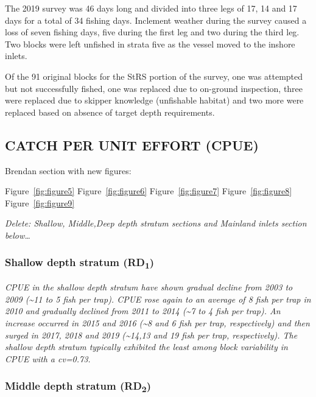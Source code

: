 \documentclass[12pt]{article}\usepackage[]{graphicx}\usepackage[]{color}
\begin{document}
The 2019 survey was 46 days long and divided into three legs of 17, 14 and 17 days for a total of 34 fishing days. Inclement weather during the survey caused a loss of seven fishing days, five during the first leg and two during the third leg. Two blocks were left unfished in strata five as the vessel moved to the inshore inlets.

Of the 91 original blocks for the StRS portion of the survey, one was attempted but not successfully fished, one was replaced due to on-ground inspection, three were replaced due to skipper knowledge (unfishable habitat) and two more were replaced based on absence of target depth requirements.

\hypertarget{catch-per-unit-effort-cpue}{%
\subsection{CATCH PER UNIT EFFORT (CPUE)}\label{catch-per-unit-effort-cpue}}

Brendan section with new figures:

Figure~\ref{fig:figure5} Figure~\ref{fig:figure6} Figure~\ref{fig:figure7} Figure~\ref{fig:figure8} Figure~\ref{fig:figure9}

\emph{Delete: Shallow, Middle,Deep depth stratum sections and Mainland inlets section below\ldots{}}

\hypertarget{shallow-depth-stratum-rd1}{%
\subsubsection{\texorpdfstring{Shallow depth stratum (RD\textsubscript{1})}{Shallow depth stratum (RD1)}}\label{shallow-depth-stratum-rd1}}

\emph{CPUE in the shallow depth stratum have shown gradual decline from 2003 to 2009 (\textasciitilde11 to 5 fish per trap). CPUE rose again to an average of 8 fish per trap in 2010 and gradually declined from 2011 to 2014 (\textasciitilde7 to 4 fish per trap). An increase occurred in 2015 and 2016 (\textasciitilde8 and 6 fish per trap, respectively) and then surged in 2017, 2018 and 2019 (\textasciitilde14,13 and 19 fish per trap, respectively). The shallow depth stratum typically exhibited the least among block variability in CPUE with a cv=0.73.}

\hypertarget{middle-depth-stratum-rd2}{%
\subsubsection{\texorpdfstring{Middle depth stratum (RD\textsubscript{2})}{Middle depth stratum (RD2)}}\label{middle-depth-stratum-rd2}}
\end{document}
